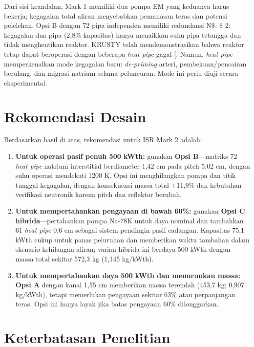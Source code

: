 \documentclass[
  indonesian,
  12pt,
  a4paper,
]{report}
\providecommand{\tightlist}{%
  \setlength{\itemsep}{0pt}\setlength{\parskip}{0pt}}
\begin{document}
Dari sisi keandalan, Mark 1 memiliki dua pompa EM yang keduanya harus
bekerja; kegagalan total aliran menyebabkan pemanasan teras dan potensi
pelelehan. Opsi B dengan 72 pipa independen memiliki redundansi N\$- \$
2: kegagalan dua pipa (2,8\% kapasitas) hanya menaikkan suhu pipa
tetangga dan tidak menghentikan reaktor. KRUSTY telah mendemonstrasikan
bahwa reaktor tetap dapat beroperasi dengan beberapa \emph{heat pipe}
gagal {[}\citeproc{ref-poston2020design}{4}{]}. Namun, \emph{heat pipe}
memperkenalkan mode kegagalan baru: \emph{de-priming} arteri,
pembekuan/pencairan berulang, dan migrasi natrium selama peluncuran.
Mode ini perlu diuji secara eksperimental.

\section{Rekomendasi Desain}\label{rekomendasi-desain}

Berdasarkan hasil di atas, rekomendasi untuk ISR Mark 2 adalah:

\begin{enumerate}
\def\labelenumi{\arabic{enumi}.}
\tightlist
\item
  \textbf{Untuk operasi pasif penuh 500 kWth:} gunakan \textbf{Opsi
  B}---matriks 72 \emph{heat pipe} natrium interstitial berdiameter 1,42
  cm pada pitch 5,02 cm, dengan suhu operasi mendekati 1200 K. Opsi ini
  menghilangkan pompa dan titik tunggal kegagalan, dengan konsekuensi
  massa total +11,9\% dan kebutuhan verifikasi neutronik karena pitch
  dan reflektor berubah.
\item
  \textbf{Untuk mempertahankan pengayaan di bawah 60\%:} gunakan
  \textbf{Opsi C hibrida}---pertahankan pompa Na-78K untuk daya nominal
  dan tambahkan 61 \emph{heat pipe} 0,6 cm sebagai sistem pendingin
  pasif cadangan. Kapasitas 75,1 kWth cukup untuk panas peluruhan dan
  memberikan waktu tambahan dalam skenario kehilangan aliran; varian
  hibrida ini berdaya 500 kWth dengan massa total sekitar 572,3 kg
  (1,145 kg/kWth).
\item
  \textbf{Untuk mempertahankan daya 500 kWth dan menurunkan massa:}
  \textbf{Opsi A} dengan kanal 1,55 cm memberikan massa terendah (453,7
  kg; 0,907 kg/kWth), tetapi memerlukan pengayaan sekitar 63\% atau
  perpanjangan teras. Opsi ini hanya layak jika batas pengayaan 60\%
  dilonggarkan.
\end{enumerate}

\section{Keterbatasan Penelitian}\label{keterbatasan-penelitian}
\end{document}

